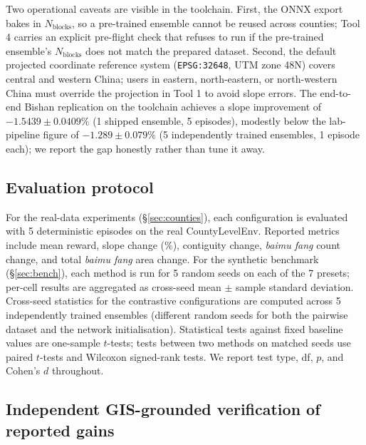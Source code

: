 \documentclass[11pt]{article}
\begin{document}
Two operational caveats are visible in the toolchain. First, the ONNX export bakes in $N_{\text{blocks}}$, so a pre-trained ensemble cannot be reused across counties; Tool 4 carries an explicit pre-flight check that refuses to run if the pre-trained ensemble's $N_{\text{blocks}}$ does not match the prepared dataset. Second, the default projected coordinate reference system (\texttt{EPSG:32648}, UTM zone 48N) covers central and western China; users in eastern, north-eastern, or north-western China must override the projection in Tool 1 to avoid slope errors. The end-to-end Bishan replication on the toolchain achieves a slope improvement of $-1.5439 \pm 0.0409\%$ (1 shipped ensemble, 5 episodes), modestly below the lab-pipeline figure of $-1.289 \pm 0.079\%$ (5 independently trained ensembles, 1 episode each); we report the gap honestly rather than tune it away.

\subsection*{Evaluation protocol}

For the real-data experiments (\S\ref{sec:counties}), each configuration is evaluated with 5 deterministic episodes on the real CountyLevelEnv. Reported metrics include mean reward, slope change ($\%$), contiguity change, \textit{baimu fang} count change, and total \textit{baimu fang} area change. For the synthetic benchmark (\S\ref{sec:bench}), each method is run for 5 random seeds on each of the 7 presets; per-cell results are aggregated as cross-seed mean $\pm$ sample standard deviation. Cross-seed statistics for the contrastive configurations are computed across 5 independently trained ensembles (different random seeds for both the pairwise dataset and the network initialisation). Statistical tests against fixed baseline values are one-sample $t$-tests; tests between two methods on matched seeds use paired $t$-tests and Wilcoxon signed-rank tests. We report test type, df, $p$, and Cohen's $d$ throughout.

\subsection*{Independent GIS-grounded verification of reported gains}\label{sec:methods-validate}
\end{document}
